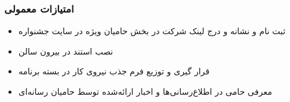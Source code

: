 \documentclass{article}
\begin{document}
\subsubsection{امتیازات معمولی}
\begin{flushright}

\begin{itemize}
\item ثبت نام و نشانه و درج لینک شرکت در بخش حامیان ویژه در سایت جشنواره
\item نصب استند در بیرون سالن
\item قرار گیری و توزیع فرم جذب نیروی کار در بسته برنامه
\item معرفی حامی در اطلاع‌رسانی‌ها و اخبار ارائه‌شده توسط حامیان رسانه‌ای
\end{itemize}
\end{flushright}
\end{document}
